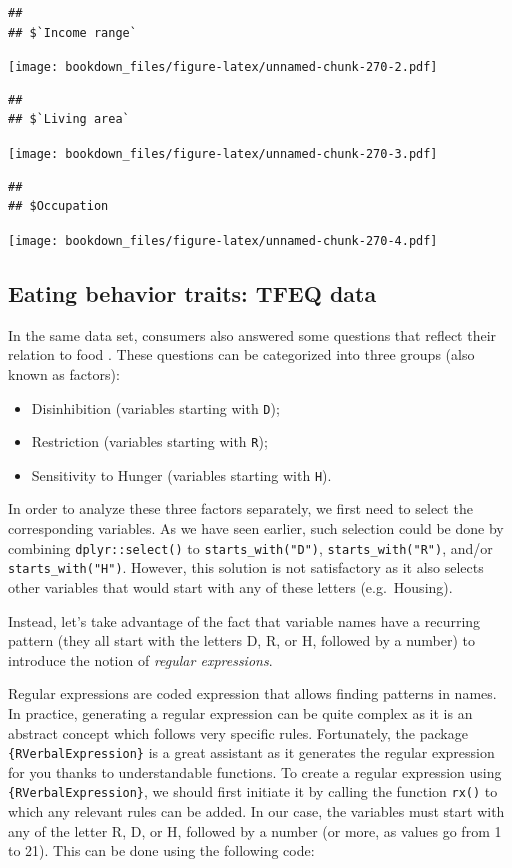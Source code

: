\documentclass[
]{krantz}
\providecommand{\tightlist}{%
  \setlength{\itemsep}{0pt}\setlength{\parskip}{0pt}}
\begin{document}
\begin{verbatim}
## 
## $`Income range`
\end{verbatim}

\texttt{[image: bookdown\_files/figure-latex/unnamed-chunk-270-2.pdf]}

\begin{verbatim}
## 
## $`Living area`
\end{verbatim}

\texttt{[image: bookdown\_files/figure-latex/unnamed-chunk-270-3.pdf]}

\begin{verbatim}
## 
## $Occupation
\end{verbatim}

\texttt{[image: bookdown\_files/figure-latex/unnamed-chunk-270-4.pdf]}

\hypertarget{regex}{%
\subsection{Eating behavior traits: TFEQ data}\label{regex}}

In the same data set, consumers also answered some questions that reflect their relation to food \citep{stunkard1985}. These questions can be categorized into three groups (also known as factors):

\begin{itemize}
\tightlist
\item
  Disinhibition (variables starting with \texttt{D});
\item
  Restriction (variables starting with \texttt{R});
\item
  Sensitivity to Hunger (variables starting with \texttt{H}).
\end{itemize}

In order to analyze these three factors separately, we first need to select the corresponding variables. As we have seen earlier, such selection could be done by combining \texttt{dplyr::select()} to \texttt{starts\_with("D")}, \texttt{starts\_with("R")}, and/or \texttt{starts\_with("H")}. However, this solution is not satisfactory as it also selects other variables that would start with any of these letters (e.g.~Housing).

Instead, let's take advantage of the fact that variable names have a recurring pattern (they all start with the letters D, R, or H, followed by a number) to introduce the notion of \emph{regular expressions}.

Regular expressions are coded expression that allows finding patterns in names. In practice, generating a regular expression can be quite complex as it is an abstract concept which follows very specific rules. Fortunately, the package \texttt{\{RVerbalExpression\}} is a great assistant as it generates the regular expression for you thanks to understandable functions.
To create a regular expression using \texttt{\{RVerbalExpression\}}, we should first initiate it by calling the function \texttt{rx()} to which any relevant rules can be added. In our case, the variables must start with any of the letter R, D, or H, followed by a number (or more, as values go from 1 to 21). This can be done using the following code:
\end{document}
